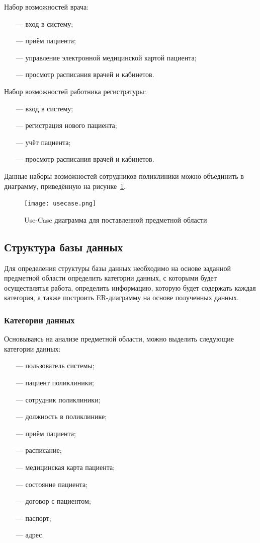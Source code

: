 Набор возможностей врача:
\begin{itemize}[leftmargin=1.6\parindent]
	\item[---] вход в систему;
	\item[---] приём пациента;
	\item[---] управление электронной медицинской картой пациента;
	\item[---] просмотр расписания врачей и кабинетов.
\end{itemize}

Набор возможностей работника регистратуры:
\begin{itemize}[leftmargin=1.6\parindent]
	\item[---] вход в систему;
	\item[---] регистрация нового пациента;
	\item[---] учёт пациента;
	\item[---] просмотр расписания врачей и кабинетов.
\end{itemize}

Данные наборы возможностей сотрудников поликлиники можно объединить в диаграмму, приведённую на рисунке~\ref{fig:usecase}.

\begin{figure}[h!]
	\centering
	\captionsetup{justification=centering}
	\texttt{[image: usecase.png]}
	\caption{Use-Case диаграмма для поставленной предметной области}
	\label{fig:usecase}
\end{figure}


\subsection{Структура базы данных}

Для определения структуры базы данных необходимо на основе заданной предметной области определить категории данных, с которыми будет осуществлятья работа, определить информацию, которую будет содержать каждая категория, а также построить ER-диаграмму на основе полученных данных.

\subsubsection{Категории данных}

Основываясь на анализе предметной области, можно выделить следующие категории данных:
\begin{itemize}[leftmargin=1.6\parindent]
	\item[---] пользователь системы;
	\item[---] пациент поликлиники;
	\item[---] сотрудник поликлиники;
	\item[---] должность в поликлинике;
	\item[---] приём пациента;
	\item[---] расписание;
	\item[---] медицинская карта пациента;
	\item[---] состояние пациента;
	\item[---] договор с пациентом;
	\item[---] паспорт;
	\item[---] адрес.
\end{itemize}

